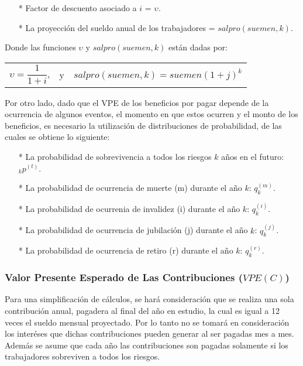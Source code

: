 \documentclass[12pt,letterpaper,titlepage]{article}
\begin{document}
\begin{itemize}
	\item [*] Factor de descuento asociado a $i$ = $\upsilon$.
	\item [*] La proyección del sueldo anual de los trabajadores = $salpro(suemen,k)$.
\end{itemize}

Donde las funciones  $\upsilon$ y $salpro(suemen,k)$ están dadas por:

\begin{center}
	\begin{tabular}{ccc}
		$\upsilon = \dfrac{1}{1+i}$, & y & $salpro(suemen,k)=suemen(1+j)^{k}$
	\end{tabular} 
\end{center}

Por otro lado, dado que el VPE de los beneficios por pagar depende de la ocurrencia de algunos eventos, el momento en que estos ocurren y el monto de los beneficios, es necesario la utilización de distribuciones de probabilidad, de las cuales se obtiene lo siguiente:

\begin{itemize}
		\item [*] La probabilidad de sobrevivencia a todos los riesgos $k$ años en el futuro: $_{k}p^{(t)}$.
		\item [*] La probabilidad de ocurrencia de muerte (m) durante el año $k$: $q_{k}^{(m)}$.
		\item [*] La probabilidad de ocurrenia de invalidez (i) durante el año $k$: $q_{k}^{(i)}$.
		\item [*] La probabilidad de ocurrencia de jubilación (j) durante el año $k$: $q_{k}^{(j)}$.
		\item [*] La probabilidad de ocurrencia de retiro (r) durante el año $k$: $q_{k}^{(r)}$.
\end{itemize}

\subsubsection{Valor Presente Esperado de Las Contribuciones ($V\!PE(C)$)}

Para una simplificación de cálculos, se hará consideración que se realiza una sola contribución anual, pagadera al final del año en estudio, la cual es igual a 12 veces el sueldo mensual proyectado. Por lo tanto no se tomará en consideración los interéses que dichas contribuciones pueden generar al ser pagadas mes a  mes. Además se asume que cada año las contribuciones son pagadas solamente si los trabajadores sobreviven a todos los riesgos.
\end{document}
